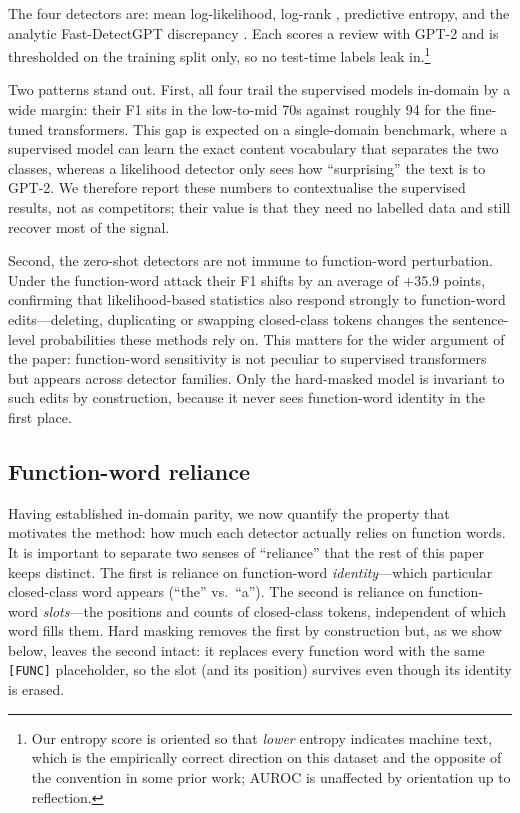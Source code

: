 \documentclass[10pt,twocolumn]{article}
\begin{document}
The four detectors are: mean log-likelihood, log-rank \cite{gltr}, predictive entropy, and the analytic Fast-DetectGPT discrepancy \cite{fastdetectgpt}. Each scores a review with GPT-2 and is thresholded on the training split only, so no test-time labels leak in.\footnote{Our entropy score is oriented so that \emph{lower} entropy indicates machine text, which is the empirically correct direction on this dataset and the opposite of the convention in some prior work; AUROC is unaffected by orientation up to reflection.}

Two patterns stand out. First, all four trail the supervised models in-domain by a wide margin: their F1 sits in the low-to-mid 70s against roughly 94 for the fine-tuned transformers. This gap is expected on a single-domain benchmark, where a supervised model can learn the exact content vocabulary that separates the two classes, whereas a likelihood detector only sees how ``surprising'' the text is to GPT-2. We therefore report these numbers to contextualise the supervised results, not as competitors; their value is that they need no labelled data and still recover most of the signal.

Second, the zero-shot detectors are not immune to function-word perturbation. Under the function-word attack their F1 shifts by an average of $+35.9$ points, confirming that likelihood-based statistics also respond strongly to function-word edits---deleting, duplicating or swapping closed-class tokens changes the sentence-level probabilities these methods rely on. This matters for the wider argument of the paper: function-word sensitivity is not peculiar to supervised transformers but appears across detector families. Only the hard-masked model is invariant to such edits by construction, because it never sees function-word identity in the first place.

\subsection{Function-word reliance}
Having established in-domain parity, we now quantify the property that motivates the method: how much each detector actually relies on function words. It is important to separate two senses of ``reliance'' that the rest of this paper keeps distinct. The first is reliance on function-word \emph{identity}---which particular closed-class word appears (``the'' vs.\ ``a''). The second is reliance on function-word \emph{slots}---the positions and counts of closed-class tokens, independent of which word fills them. Hard masking removes the first by construction but, as we show below, leaves the second intact: it replaces every function word with the same \texttt{[FUNC]} placeholder, so the slot (and its position) survives even though its identity is erased.
\end{document}

